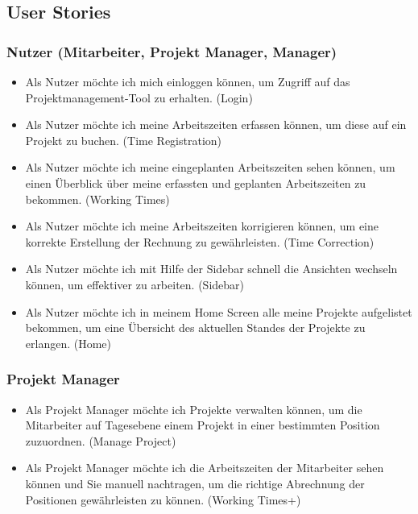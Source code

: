 \documentclass{article}
\begin{document}
    \subsection{ User Stories}
        \subsubsection{Nutzer (Mitarbeiter, Projekt Manager, Manager) }
         \begin{itemize}
        \item Als Nutzer möchte ich mich einloggen können, um Zugriff auf das Projektmanagement-Tool zu erhalten. (Login)
        \item Als Nutzer möchte ich meine Arbeitszeiten erfassen können, um diese auf ein Projekt zu buchen. (Time Registration)
        \item Als Nutzer möchte ich meine eingeplanten Arbeitszeiten sehen können, um einen Überblick über meine erfassten und geplanten Arbeitszeiten zu bekommen. (Working Times)
        \item Als Nutzer möchte ich meine Arbeitszeiten korrigieren können, um eine korrekte Erstellung der Rechnung zu gewährleisten. (Time Correction)
        \item Als Nutzer möchte ich mit Hilfe der Sidebar schnell die Ansichten wechseln können, um effektiver zu arbeiten. (Sidebar)
        \item Als Nutzer möchte ich in meinem Home Screen alle meine Projekte aufgelistet bekommen, um eine Übersicht des aktuellen Standes der Projekte zu erlangen. (Home)
        \end{itemize}

        \subsubsection{ Projekt Manager}
        \begin{itemize}
        \item Als Projekt Manager möchte ich Projekte verwalten können, um die Mitarbeiter auf Tagesebene einem Projekt in einer bestimmten Position zuzuordnen. (Manage Project)
        \item Als Projekt Manager möchte ich die Arbeitszeiten der Mitarbeiter sehen können und Sie manuell nachtragen, um die richtige Abrechnung der Positionen gewährleisten zu können. (Working Times+)
        \end{itemize}
\end{document}
